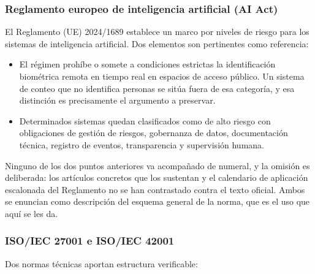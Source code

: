 \subsubsection{Reglamento europeo de inteligencia artificial (AI Act)}

El Reglamento (UE) 2024/1689 establece un marco por niveles de riesgo
para los sistemas de inteligencia artificial. Dos elementos son
pertinentes como referencia:

\begin{itemize}[leftmargin=1.5em,itemsep=0.3em]
  \item El régimen prohíbe o somete a condiciones estrictas la
        identificación biométrica remota en tiempo real en espacios de
        acceso público. Un sistema de conteo que no identifica personas
        se sitúa fuera de esa categoría, y esa distinción es
        precisamente el argumento a preservar.
  \item Determinados sistemas quedan clasificados como de alto riesgo
        con obligaciones de gestión de riesgos, gobernanza de datos,
        documentación técnica, registro de eventos, transparencia y
        supervisión humana.
\end{itemize}

Ninguno de los dos puntos anteriores va acompañado de numeral, y la
omisión es deliberada: los artículos concretos que los sustentan y el
calendario de aplicación escalonada del Reglamento no se han contrastado
contra el texto oficial. Ambos se enuncian como descripción del esquema
general de la norma, que es el uso que aquí se les da.


\subsubsection{ISO/IEC 27001 e ISO/IEC 42001}

Dos normas técnicas aportan estructura verificable:


